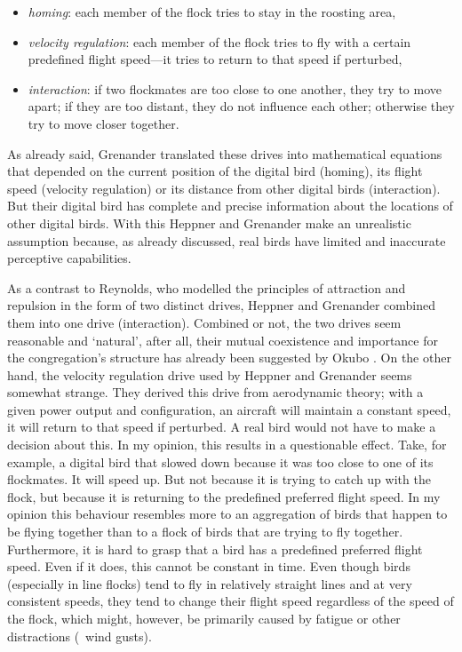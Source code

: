 \begin{itemize}
  \item \emph{homing}: each member of the flock tries to stay in the roosting area,

  \item \emph{velocity regulation}: each member of the flock tries to fly with a certain predefined flight speed---it tries to return to that speed if perturbed,

  \item \emph{interaction}: if two flockmates are too close to one another, they try to move apart; if they are too distant, they do not influence each other; otherwise they try to move closer together.
\end{itemize}

As already said, Grenander translated these drives into mathematical equations that depended on the current position of the digital bird (homing), its flight speed (velocity regulation) or its distance from other digital birds (interaction). But their digital bird has complete and precise information about the locations of other digital birds. With this Heppner and Grenander make an unrealistic assumption because, as already discussed, real birds have limited and inaccurate perceptive capabilities.

As a contrast to Reynolds, who modelled the principles of attraction and repulsion in the form of two distinct drives, Heppner and Grenander combined them into one drive (interaction). Combined or not, the two drives seem reasonable and `natural', after all, their mutual coexistence and importance for the congregation's structure has already been suggested by Okubo \cite{okubo:1980}. On the other hand, the velocity regulation drive used by Heppner and Grenander seems somewhat strange. They derived this drive from aerodynamic theory; with a given power output and configuration, an aircraft will maintain a constant speed, it will return to that speed if perturbed. A real bird would not have to make a decision about this. In my opinion, this results in a questionable effect. Take, for example, a digital bird that slowed down because it was too close to one of its flockmates. It will speed up. But not because it is trying to catch up with the flock, but because it is returning to the predefined preferred flight speed. In my opinion this behaviour resembles more to an aggregation of birds that happen to be flying together than to a flock of birds that are trying to fly together. Furthermore, it is hard to grasp that a bird has a predefined preferred flight speed. Even if it does, this cannot be constant in time. Even though birds (especially in line flocks) tend to fly in relatively straight lines and at very consistent speeds, they tend to change their flight speed regardless of the speed of the flock, which might, however, be primarily caused by fatigue or other distractions (\eg\ wind gusts).

